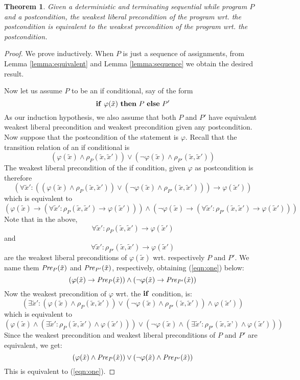 \documentclass[times]{elsarticle}
\newcommand{\pred}[1]{\mbox{\textit{#1}}}
\newtheorem{theorem}{Theorem}
\newcommand{\pif}{\mbox{\textbf{if}}}
\newcommand{\pthen}{\mbox{\textbf{then}}}
\newcommand{\pelse}{\mbox{\textbf{else}}}
\begin{document}
\begin{theorem} \label{theorem:deterministic}
  Given a deterministic and terminating sequential while program $P$
  and a postcondition, the weakest liberal precondition of the program 
  wrt. the postcondition is equivalent to the weakest precondition of 
  the program wrt. the postcondition. 
\end{theorem}

\begin{proof}
  We prove inductively. When $P$ is just a sequence of assignments,
  from Lemma \ref{lemma:equivalent} and Lemma \ref{lemma:sequence} we
  obtain the desired result.

  Now let us assume $P$ to be an if conditional, say of the form
\[
\pif ~\varphi(\tilde{x})~ \pthen ~P~ \pelse ~P'
\]
As our induction hypothesis, we also assume that both $P$ and $P'$ have
equivalent weakest liberal precondition and weakest precondition given
any postcondition. Now suppose that the postcondition of the statement
is $\varphi.$ Recall that the transition relation of an if conditional is
\[
(\varphi(\tilde{x}) \wedge \rho_P(\tilde{x},\tilde{x}')) \vee (\neg \varphi(\tilde{x}) \wedge \rho_{P'}(\tilde{x},\tilde{x}'))
\]
The weakest liberal precondition of the if condition, given
$\varphi$ as postcondition is therefore
\[
(\forall \tilde{x}' : ((\varphi(\tilde{x}) \wedge \rho_{P}(\tilde{x},\tilde{x}')) \vee (\neg \varphi(\tilde{x}) \wedge
\rho_{P'}(\tilde{x},\tilde{x}'))) \rightarrow \varphi(\tilde{x}'))
\]
which is equivalent to
\[
(\varphi(\tilde{x}) \rightarrow (\forall \tilde{x}' : \rho_P(\tilde{x},\tilde{x}') \rightarrow
\varphi(\tilde{x}'))) \wedge (\neg \varphi(\tilde{x}) \rightarrow (\forall \tilde{x}' :
\rho_{P'}(\tilde{x},\tilde{x}') \rightarrow \varphi(\tilde{x}')))
\]
Note that in the above,
\[
\forall \tilde{x}' : \rho_P(\tilde{x},\tilde{x}') \rightarrow \varphi(\tilde{x}')
\]
and
\[
\forall \tilde{x}' : \rho_{P'}(\tilde{x},\tilde{x}') \rightarrow \varphi(\tilde{x}')
\]
are the weakest liberal preconditions of $\varphi(\tilde{x})$
wrt. respectively $P$ and $P'$. We name them
$\pred{Pre}_{P}(\tilde{x})$ and $\pred{Pre}_{P'}(\tilde{x})$,
respectively, obtaining (\ref{eqn:one}) below:
\begin{equation} \label{eqn:one}
(\varphi(\tilde{x}) \rightarrow \pred{Pre}_P(\tilde{x})) \wedge (\neg \varphi(\tilde{x}) \rightarrow \pred{Pre}_{P'}(\tilde{x}))
\end{equation}
Now the weakest precondition of $\varphi$ wrt. the $\pif$ condition, is:
\[
(\exists \tilde{x}': (\varphi(\tilde{x}) \wedge \rho_P(\tilde{x},\tilde{x}')) \vee (\neg \varphi(\tilde{x}) \wedge
\rho_{P'}(\tilde{x},\tilde{x}')) \wedge \varphi(\tilde{x}'))
\]
which is equivalent to
\[
(\varphi(\tilde{x}) \wedge (\exists \tilde{x}': \rho_P(\tilde{x},\tilde{x}') \wedge \varphi(\tilde{x}'))) \vee (\neg \varphi(\tilde{x}) \wedge (\exists \tilde{x}': \rho_{P'}(\tilde{x},\tilde{x}’) \wedge \varphi(\tilde{x}')))
\]
Since the weakest precondition and weakest liberal preconditions of
$P$ and $P'$ are equivalent, we get:
\[
(\varphi(\tilde{x}) \wedge \pred{Pre}_P(\tilde{x})) \vee (\neg \varphi(\tilde{x}) \wedge \pred{Pre}_{P'}(\tilde{x}))
\]
This is equivalent to (\ref{eqn:one}).


\end{proof}
\end{document}
